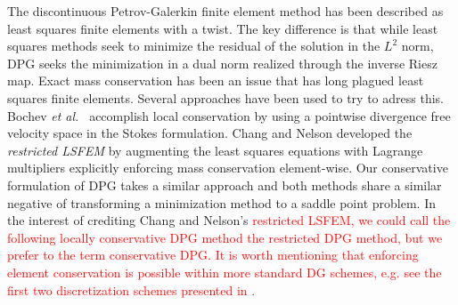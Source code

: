 \documentclass[letterpaper]{article}
\def\etal{{\it et al.~}}
\newcommand{\red}[1]{\textcolor{red}{#1}}
\begin{document}
The discontinuous Petrov-Galerkin finite element method has been described as
least squares finite elements with a twist. The key difference is that while least
squares methods seek to minimize the residual of the solution in the $L^2$
norm, DPG seeks the minimization in a dual norm realized through the
inverse Riesz map. Exact mass conservation has been an issue that has long plagued
least squares finite elements. Several approaches have been
used to try to adress this. Bochev \etal\cite{Bochev2010} accomplish local
conservation by using a pointwise divergence free velocity space in the Stokes
formulation.  Chang and Nelson\cite{ChangNelson1997} developed the
\emph{restricted LSFEM}\cite{ChangNelson1997} by augmenting the least squares
equations with Lagrange multipliers explicitly enforcing mass conservation
element-wise. Our conservative formulation of DPG takes a similar approach and
both methods share a similar negative of transforming a minimization method to a
saddle point problem. In the interest of crediting Chang and Nelson's
\red{
restricted LSFEM, we could call the following locally conservative DPG method the
restricted DPG method, but we prefer to the term conservative DPG.
It is worth mentioning that enforcing element conservation is possible within more
standard DG schemes, e.g. see the first two discretization schemes presented in \cite{AyusoMarini}.
}
\end{document}
